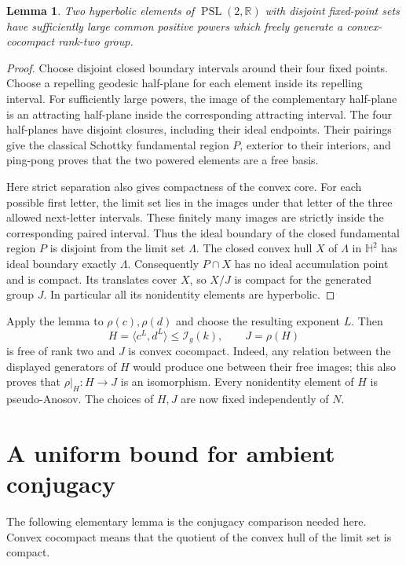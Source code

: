 \documentclass[11pt]{article}
\newtheorem{lemma}[theorem]{Lemma}
\theoremstyle{remark}\newtheorem*{remark}{Remark}
\newcommand{\PSL}{\operatorname{PSL}}
\newcommand{\HH}{\mathbb H^2}
\newcommand{\I}{\mathcal I}
\begin{document}
\begin{lemma}\label{lem:schottky}
Two hyperbolic elements of $\PSL(2,\mathbb R)$ with disjoint fixed-point
sets have sufficiently large common positive powers which freely
generate a convex-cocompact rank-two group.
\end{lemma}
\begin{proof}
Choose disjoint closed boundary intervals around their four fixed
points. Choose a repelling geodesic half-plane for each element inside
its repelling interval. For sufficiently large powers, the image of
the complementary half-plane is an attracting half-plane inside the
corresponding attracting interval. The four half-planes have disjoint
closures, including their ideal endpoints. Their pairings give the
classical Schottky fundamental region $P$, exterior to their interiors,
and ping-pong proves that the two powered elements are a free basis.

Here strict separation also gives compactness of the convex core.
For each possible first letter, the limit set lies in the images under
that letter of the three allowed next-letter intervals. These finitely
many images are strictly inside the corresponding paired interval.
Thus the ideal boundary of the closed fundamental region $P$ is disjoint
from the limit set $\Lambda$. The closed convex hull $X$ of $\Lambda$
in $\HH$ has ideal boundary exactly $\Lambda$. Consequently $P\cap X$
has no ideal accumulation point and is compact. Its translates cover
$X$, so $X/J$ is compact for the generated group $J$. In particular all
its nonidentity elements are hyperbolic.
\end{proof}

Apply the lemma to $\rho(c),\rho(d)$ and choose the resulting exponent
$L$. Then
\begin{equation}\label{eq:H}
 H=\langle c^L,d^L\rangle\le\I_g(k),\qquad J=\rho(H)
\end{equation}
is free of rank two and $J$ is convex cocompact.
Indeed, any relation between the displayed generators of $H$ would
produce one between their free images; this also proves that
$\rho|_H:H\to J$ is an isomorphism. Every nonidentity element of $H$
is pseudo-Anosov. The choices of $H,J$ are now fixed independently of $N$.

\section{A uniform bound for ambient conjugacy}
The following elementary lemma is the conjugacy comparison needed here.
Convex cocompact means that the quotient of the convex hull of the limit
set is compact.
\end{document}
